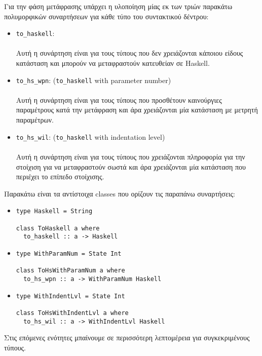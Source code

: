 \documentclass[diploma]{softlab-thesis}
\def\H{Haskell}
\begin{document}
Για την φάση μετάφρασης υπάρχει η υλοποίηση μίας εκ των τριών παρακάτω
πολυμορφικών συναρτήσεων για κάθε τύπο του συντακτικού δέντρου:

\begin{itemize}
\item
\verb|to_haskell|:\\\\
Αυτή η συνάρτηση είναι για τους τύπους που δεν χρειάζονται κάποιου είδους
κατάσταση και μπορούν να μεταφραστούν κατευθείαν σε \H.
\item
\verb|to_hs_wpn|: (\verb|to_haskell| with parameter number) \\\\
Αυτή η συνάρτηση είναι για τους τύπους που προσθέτουν καινούργιες παραμέτρους
κατά την μετάφραση και άρα χρειάζονται μία κατάσταση με μετρητή παραμέτρων.
\item
\verb|to_hs_wil|: (\verb|to_haskell| with indentation level)\\\\
Αυτή η συνάρτηση είναι για τους τύπους που χρειάζονται πληροφορία για την
στοίχιση για να μεταφραστούν σωστά και άρα χρειάζονται μία κατάσταση που
περιέχει το επίπεδο στοίχισης.
\end{itemize}
Παρακάτω είναι τα αντίστοιχα classes που ορίζουν τις παραπάνω συναρτήσεις:
\begin{itemize}
\item
\begin{verbatim}
type Haskell = String

class ToHaskell a where
  to_haskell :: a -> Haskell
\end{verbatim}

\item
\begin{verbatim}
type WithParamNum = State Int

class ToHsWithParamNum a where
  to_hs_wpn :: a -> WithParamNum Haskell
\end{verbatim}

\item
\begin{verbatim}
type WithIndentLvl = State Int

class ToHsWithIndentLvl a where
  to_hs_wil :: a -> WithIndentLvl Haskell
\end{verbatim}
\end{itemize}
Στις επόμενες ενότητες μπαίνουμε σε περισσότερη λεπτομέρεια για συγκεκριμένους
τύπους.

\newpage
\end{document}
